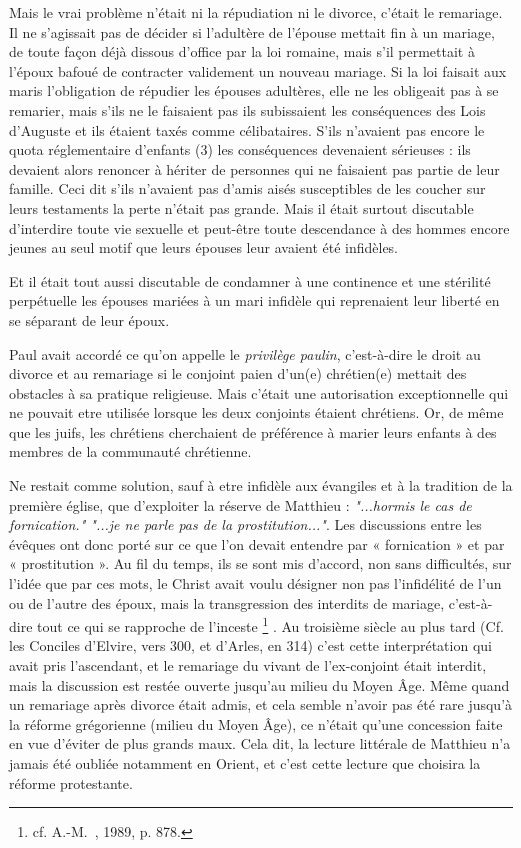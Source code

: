  Mais le vrai problème n'était ni la répudiation ni le divorce, c'était le remariage. Il ne s'agissait pas de décider si l'adultère de l'épouse mettait fin à un mariage, de toute façon déjà dissous d'office par la loi romaine, mais s'il permettait à l'époux bafoué de contracter validement un nouveau mariage. Si la loi faisait aux maris l'obligation de répudier les épouses adultères, elle ne les obligeait pas à se remarier, mais s'ils ne le faisaient pas ils subissaient les conséquences des Lois d'Auguste et ils étaient taxés comme célibataires. S'ils n'avaient pas encore le quota réglementaire d'enfants (3) les conséquences devenaient sérieuses : ils devaient alors renoncer à hériter de personnes qui ne faisaient pas partie de leur famille. Ceci dit s'ils n'avaient pas d'amis aisés susceptibles de les coucher sur leurs testaments la perte n'était pas grande. Mais il était surtout discutable d'interdire toute vie sexuelle et peut-être toute descendance à des hommes encore jeunes au seul motif que leurs épouses leur avaient été infidèles. 
 
 Et il était tout aussi discutable de condamner à une continence et une stérilité perpétuelle les épouses mariées à un mari infidèle qui reprenaient leur liberté en se séparant de leur époux. 
 
 Paul avait accordé ce qu'on appelle le \emph{privilège paulin}, c'est-à-dire le droit au divorce et au remariage si le conjoint paien d'un(e) chrétien(e) mettait des obstacles à sa pratique religieuse. Mais c'était une  autorisation exceptionnelle qui ne pouvait etre utilisée lorsque les deux conjoints étaient chrétiens. Or, de même que les juifs, les chrétiens cherchaient de préférence à marier leurs enfants à des membres de la communauté chrétienne.  
 
 Ne restait comme solution, sauf à etre infidèle aux évangiles et à la tradition de la première église, que d'exploiter la réserve de Matthieu : \emph{"...hormis le cas de fornication." "...je ne parle pas de la prostitution..."}. Les discussions entre les évêques ont donc porté sur ce que l'on devait entendre par « fornication » et par « prostitution ». Au fil du temps, ils se sont mis d'accord, non sans difficultés, sur l'idée que par ces mots, le Christ avait voulu désigner non pas l'infidélité de l'un ou de l'autre des époux, mais la transgression des interdits de mariage, c'est-à-dire tout ce qui se rapproche de l'inceste%
\footnote{cf. A.-M.~, 1989, p. 878.}%
. Au troisième siècle au plus tard (Cf. les Conciles d'Elvire, vers 300, et d'Arles, en 314) c'est cette interprétation qui avait pris l'ascendant, et le remariage du vivant de l'ex-conjoint était interdit, mais la discussion est restée ouverte jusqu'au milieu du Moyen Âge. Même quand un remariage après divorce était admis, et cela semble n'avoir pas été rare jusqu'à la réforme grégorienne (milieu du Moyen Âge), ce n'était qu'une concession faite en vue d'éviter de plus grands maux. Cela dit, la lecture littérale de Matthieu n'a jamais été oubliée notamment en Orient, et c'est cette lecture que choisira la réforme protestante.


 


  












